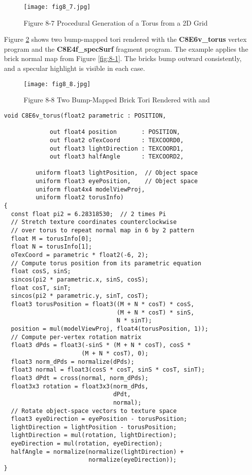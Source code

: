 \documentclass[../main.tex]{subfiles}
\begin{document}
\begin{figure}
    \centering
    \texttt{[image: fig8\_7.jpg]}
    \caption{Figure 8-7 Procedural Generation of a Torus from a 2D Grid}
    \label{fig:8-7}
\end{figure}

Figure \ref{fig:8-8} shows two bump-mapped tori rendered with the \textbf{C8E6v_torus} vertex program and the \textbf{C8E4f_specSurf} fragment program. The example applies the brick normal map from Figure \ref{fig:8-1}. The bricks bump outward consistently, and a specular highlight is visible in each case.

\begin{figure}
    \centering
    \texttt{[image: fig8\_8.jpg]}
    \caption{Figure 8-8 Two Bump-Mapped Brick Tori Rendered with and}
    \label{fig:8-8}
\end{figure}

\FloatBarrier
\begin{lstlisting}[caption=Example 8-6. The \textbf{C8E6v_torus} Vertex Program]
void C8E6v_torus(float2 parametric : POSITION,

             out float4 position       : POSITION,
             out float2 oTexCoord      : TEXCOORD0,
             out float3 lightDirection : TEXCOORD1,
             out float3 halfAngle      : TEXCOORD2,

         uniform float3 lightPosition,  // Object space
         uniform float3 eyePosition,    // Object space
         uniform float4x4 modelViewProj,
         uniform float2 torusInfo)
{
  const float pi2 = 6.28318530;  // 2 times Pi
  // Stretch texture coordinates counterclockwise
  // over torus to repeat normal map in 6 by 2 pattern
  float M = torusInfo[0];
  float N = torusInfo[1];
  oTexCoord = parametric * float2(-6, 2);
  // Compute torus position from its parametric equation
  float cosS, sinS;
  sincos(pi2 * parametric.x, sinS, cosS);
  float cosT, sinT;
  sincos(pi2 * parametric.y, sinT, cosT);
  float3 torusPosition = float3((M + N * cosT) * cosS,
                                (M + N * cosT) * sinS,
                                N * sinT);
  position = mul(modelViewProj, float4(torusPosition, 1));
  // Compute per-vertex rotation matrix
  float3 dPds = float3(-sinS * (M + N * cosT), cosS *
                      (M + N * cosT), 0);
  float3 norm_dPds = normalize(dPds);
  float3 normal = float3(cosS * cosT, sinS * cosT, sinT);
  float3 dPdt = cross(normal, norm_dPds);
  float3x3 rotation = float3x3(norm_dPds,
                               dPdt,
                               normal);
  // Rotate object-space vectors to texture space
  float3 eyeDirection = eyePosition - torusPosition;
  lightDirection = lightPosition - torusPosition;
  lightDirection = mul(rotation, lightDirection);
  eyeDirection = mul(rotation, eyeDirection);
  halfAngle = normalize(normalize(lightDirection) +
                        normalize(eyeDirection));
}
\end{lstlisting}
\FloatBarrier
\end{document}
